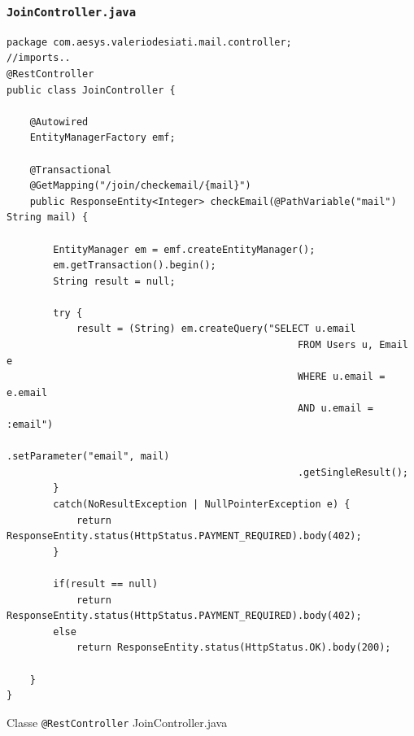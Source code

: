 \subsubsection{\texttt{JoinController.java}}
\begin{algorithm}[H]
\centering
\begin{verbatim}
package com.aesys.valeriodesiati.mail.controller;
//imports..
@RestController
public class JoinController {
    
    @Autowired
    EntityManagerFactory emf;
    
    @Transactional
    @GetMapping("/join/checkemail/{mail}")
    public ResponseEntity<Integer> checkEmail(@PathVariable("mail") String mail) {
        
        EntityManager em = emf.createEntityManager();
        em.getTransaction().begin();
        String result = null;
        
        try {
            result = (String) em.createQuery("SELECT u.email
                                                  FROM Users u, Email e
                                                  WHERE u.email = e.email 
                                                  AND u.email = :email")
                                                  .setParameter("email", mail)
                                                  .getSingleResult();
        }
        catch(NoResultException | NullPointerException e) {
            return ResponseEntity.status(HttpStatus.PAYMENT_REQUIRED).body(402);
        }
        
        if(result == null)
            return ResponseEntity.status(HttpStatus.PAYMENT_REQUIRED).body(402);
        else
            return ResponseEntity.status(HttpStatus.OK).body(200);
            
    }
}

\end{verbatim}
\caption{Classe \texttt{@RestController} JoinController.java}\label{alg:joincontrollerjava}
\end{algorithm}

